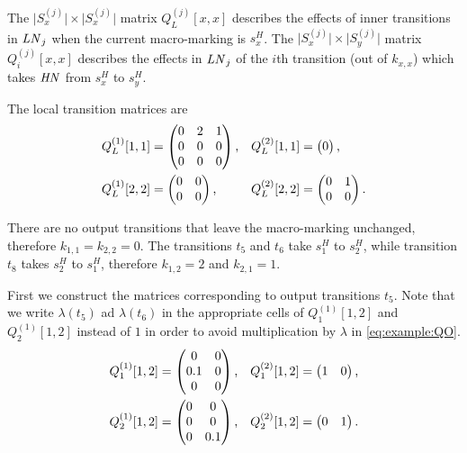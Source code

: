 \documentclass[a4paper,10pt,twoside,openright]{memoir}
\newcommand*{\LN}{\textnormal{\emph{LN}}}
\newcommand*{\HN}{\textnormal{\emph{HN}}}
\begin{document}
The $\lvert S^{(j)}_{x} \rvert \times \lvert S^{(j)}_{x} \rvert$
matrix $Q^{(j)}_L[x, x]$ describes the effects of inner transitions in
$\LN_j$ when the current macro-marking is $s^H_x$. The
$\lvert S^{(j)}_{x} \rvert \times \lvert S^{(j)}_{y} \rvert$ matrix
$Q^{(j)}_i[x, x]$ describes the effects in $\LN_j$ of the $i$th
transition (out of $k_{x, x}$) which takes $\HN$ from $s^H_x$ to
$s^H_y$.

The local transition matrices are
\begin{align}
  Q^{(1)}_L[1, 1] &= \begin{pmatrix}
    0 & 2 & 1 \\
    0 & 0 & 0 \\
    0 & 0 & 0
  \end{pmatrix} \text,
  & Q^{(2)}_L[1, 1] &= \begin{pmatrix}
    0
  \end{pmatrix} \text, \\
  Q^{(1)}_L[2, 2] &= \begin{pmatrix}
    0 & 0 \\
    0 & 0
  \end{pmatrix} \text, &
  Q^{(2)}_L[2, 2] &= \begin{pmatrix}
    0 & 1 \\
    0 & 0
  \end{pmatrix} \text.
\end{align}

There are no output transitions that leave the macro-marking
unchanged, therefore $k_{1, 1} = k_{2, 2} = 0$. The transitions $t_5$
and $t_6$ take $s^H_1$ to $s^H_2$, while transition $t_8$ takes
$s^H_2$ to $s^H_1$, therefore $k_{1, 2} = 2$ and $k_{2, 1} = 1$.

First we construct the matrices corresponding to output transitions
$t_5$. Note that we write $\lambda(t_5)$ ad $\lambda(t_6)$ in the
appropriate cells of $Q^{(1)}_1[1, 2]$ and $Q^{(1)}_2[1, 2]$ instead
of $1$ in order to avoid multiplication by $\lambda$ in
\eqref{eq:example:QO}.
\begin{align}
  Q^{(1)}_1[1, 2] &= \begin{pmatrix}
    0 & 0 \\
    0.1 & 0 \\
    0 & 0
  \end{pmatrix} \text, &
  Q^{(2)}_1[1, 2] &= \begin{pmatrix}
    1 & 0
  \end{pmatrix} \text, \\
  Q^{(1)}_2[1, 2] &= \begin{pmatrix}
    0 & 0 \\
    0 & 0 \\
    0 & 0.1
  \end{pmatrix} \text, &
  Q^{(2)}_2[1, 2] &= \begin{pmatrix}
    0 & 1
  \end{pmatrix} \text. \\
\end{align}
\end{document}
